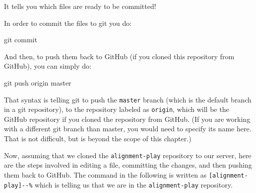 \documentclass[]{krantz}
\makeatletter
\newenvironment{Shaded}{\begin{snugshade}}{\end{snugshade}}
\newcommand{\FunctionTok}[1]{\textcolor[rgb]{0,0,0}{#1}}
\newcommand{\NormalTok}[1]{#1}
\newenvironment{kframe}{%
\medskip{}
\setlength{\fboxsep}{.8em}
 \def\at@end@of@kframe{}%
 \ifinner\ifhmode%
  \def\at@end@of@kframe{\end{minipage}}%
  \begin{minipage}{\columnwidth}%
 \fi\fi%
 \def\FrameCommand##1{\hskip\@totalleftmargin \hskip-\fboxsep
 \colorbox{shadecolor}{##1}\hskip-\fboxsep
     \hskip-\linewidth \hskip-\@totalleftmargin \hskip\columnwidth}%
 \MakeFramed {\advance\hsize-\width
   \@totalleftmargin\z@ \linewidth\hsize
   \@setminipage}}%
 {\par\unskip\endMakeFramed%
 \at@end@of@kframe}
\renewenvironment{Shaded}{\begin{kframe}}{\end{kframe}}
\makeatother
\begin{document}
It tells you which files are ready to be committed!

In order to commit the files to git you do:

\begin{Shaded}
\begin{Highlighting}[]
\FunctionTok{git}\NormalTok{ commit}
\end{Highlighting}
\end{Shaded}

And then, to push them back to GitHub (if you cloned this repository
from GitHub), you can simply do:

\begin{Shaded}
\begin{Highlighting}[]
\FunctionTok{git}\NormalTok{ push origin master}
\end{Highlighting}
\end{Shaded}

That syntax is telling git to push the \texttt{master} branch (which is
the default branch in a git repository), to the repository labeled as
\texttt{origin}, which will be the GitHub repository if you cloned the repository
from GitHub. (If you are working with a different git branch than master,
you would need to specify its name here. That is not difficult, but is
beyond the scope of this chapter.)

Now, assuming that we cloned the \texttt{alignment-play} repository to our
server, here are the steps involved in editing a file, committing the
changes, and then pushing them back to GitHub. The command in the following
is written as \texttt{{[}alignment-play{]}-\/-\%} which is telling us that we are in the
\texttt{alignment-play} repository.
\end{document}
